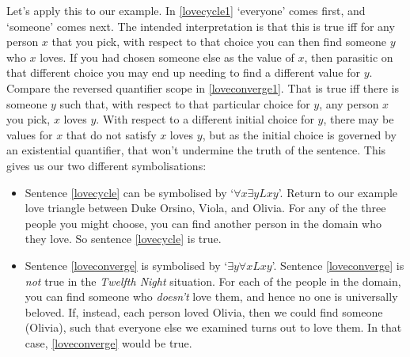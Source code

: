 Let's apply this to our example. In \ref{lovecycle1} `everyone' comes first, and `someone' comes next. The intended interpretation is that this is true iff for any person $x$ that you pick, with respect to that choice you can then find someone $y$ who $x$ loves. If you had chosen someone else as the value of $x$, then parasitic on that different choice you may end up needing to find a different value for $y$. Compare the reversed quantifier scope in \ref{loveconverge1}. That is true iff there is someone $y$ such that, with respect to that particular choice for $y$, any person $x$ you pick, $x$ loves $y$. With respect to a different initial choice for $y$, there may be values for $x$ that do not satisfy $x$ loves $y$, but as the initial choice is governed by an existential quantifier, that won't undermine the truth of the sentence. This gives us our two different symbolisations:
\begin{itemize}
	\item Sentence \ref{lovecycle} can be symbolised by `$\forall x \exists y Lxy$'. Return to our example love triangle between Duke Orsino, Viola, and Olivia. For any of the three people you might choose, you can find another person in the domain who they love. So sentence \ref{lovecycle} is true. 
\item Sentence \ref{loveconverge} is symbolised by `$\exists y \forall x Lxy$'. Sentence \ref{loveconverge} is \emph{not} true in the \emph{Twelfth Night} situation. For each of the people in the domain, you can find someone who \emph{doesn't} love them, and hence no one is universally beloved. If, instead, each person loved Olivia, then we could find someone (Olivia), such that everyone else we examined turns out to love them. In that case, \ref{loveconverge} would be true.
\end{itemize}


